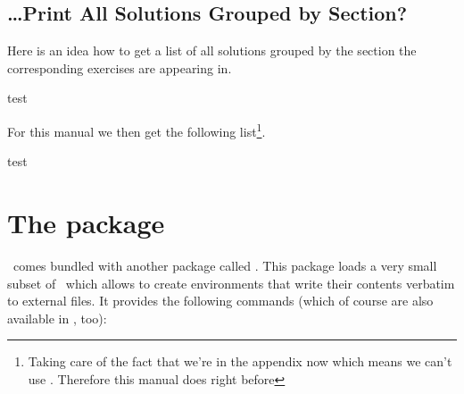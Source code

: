 \documentclass{xsim-manual}
\begin{document}

\subsection{\dots Print All Solutions Grouped by Section?}
Here is an idea how to get a list of all solutions grouped by the section the
corresponding exercises are appearing in.
\begin{sourcecode}

  \setcounter{sections}{1}
  \whileboolexpr
    { test {} }
    {
      \printsolutions[section=\value{sections},headings-template=per-section]
    }
\end{sourcecode}
For this manual we then get the following list\footnote{Taking care of the
  fact that we're in the appendix now which means we can't use
  .  Therefore this manual does
   right before
  }.

\setcounter{sections}{1}
\whileboolexpr
  { test {} }
  {
    \printsolutions[section=\value{sections},headings-template=per-section]
  }
    
\section{The  package}\label{sec:xsimverb-package}
\xsim\ comes bundled with another package called
\xsimverbversion.  This package loads a very small subset of
\xsim\ which allows to create environments that write their contents verbatim
to external files.  It provides the following commands (which of course are
also available in \xsim, too):
\end{document}
